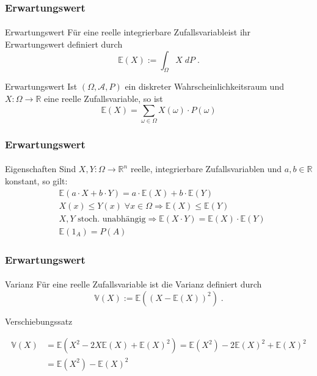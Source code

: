 \documentclass{beamer}
\begin{document}
\begin{frame}
    \frametitle{Erwartungswert}
\framesubtitle{}
\begin{block}{Erwartungswert}
Für eine reelle integrierbare Zufallsvariableist ihr  Erwartungswert  definiert durch
$$ \mathbb{E} (X) := \int_{\Omega} X \; dP \; .$$
\end{block}
 \begin{block}{Erwartungswert}
Ist $(\Omega, \mathcal{A}, P)$ ein diskreter Wahrscheinlichkeitsraum und $X :\Omega \to \mathbb{R}$ eine reelle Zufallsvariable, so ist
$$ \mathbb{E} (X) = \sum_{\omega \in \Omega}  X(\omega) \cdot P(\omega)$$
\end{block}
 \end{frame}

 \begin{frame}
    \frametitle{Erwartungswert}
\framesubtitle{}
\begin{block}{Eigenschaften}
Sind $X,Y : \Omega \to \mathbb{R}^n$   reelle, integrierbare  Zufallsvariablen und $a,b \in \mathbb{R}$ konstant, so gilt:
\begin{align*}
& \mathbb{E}(a \cdot X + b \cdot Y) = a \cdot \mathbb{E}(X) + b \cdot \mathbb{E}(Y) \\
& X(x) \leq Y(x) \;  \forall x \in \Omega \Rightarrow \mathbb{E}(X) \leq \mathbb{E}(Y) \\
& X ,Y \text{ stoch. unabhängig} \Rightarrow   \mathbb{E}(X \cdot Y) =  \mathbb{E}(X) \cdot  \mathbb{E}(Y) \\
& \mathbb{E} (1_A) = P (A)
\end{align*}
\end{block}
 \end{frame}

 \begin{frame}
    \frametitle{Erwartungswert}
\framesubtitle{}
\begin{block}{Varianz}
Für eine reelle Zufallsvariable ist die Varianz definiert durch
$$ \mathbb{V} (X) :=  \mathbb{E}( (X - \mathbb{E}(X))^2) \; .$$
\end{block}
\begin{block}{Verschiebungssatz}

\begin{align*}
 \mathbb{V}(X) & = \mathbb{E}(X^2 - 2X \mathbb{E}(X) + \mathbb{E}(X)^2) = \mathbb{E}(X^2) - 2 \mathbb{E}(X)^2 +  \mathbb{E}(X)^2 \\
& =  \mathbb{E}(X^2) -  \mathbb{E}(X)^2 \\
\end{align*}
\end{block}
 \end{frame}
\end{document}
